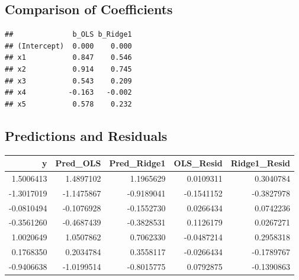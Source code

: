 \documentclass[]{book}
\newenvironment{Shaded}{\begin{snugshade}}{\end{snugshade}}
\newcommand{\KeywordTok}[1]{\textcolor[rgb]{0.13,0.29,0.53}{\textbf{#1}}}
\newcommand{\DecValTok}[1]{\textcolor[rgb]{0.00,0.00,0.81}{#1}}
\newcommand{\StringTok}[1]{\textcolor[rgb]{0.31,0.60,0.02}{#1}}
\newcommand{\OperatorTok}[1]{\textcolor[rgb]{0.81,0.36,0.00}{\textbf{#1}}}
\newcommand{\NormalTok}[1]{#1}
\begin{document}
\subsection{Comparison of
Coefficients}\label{comparison-of-coefficients}

\begin{Shaded}
\end{Shaded}

\begin{verbatim}
##              b_OLS b_Ridge1
## (Intercept)  0.000    0.000
## x1           0.847    0.546
## x2           0.914    0.745
## x3           0.543    0.209
## x4          -0.163   -0.002
## x5           0.578    0.232
\end{verbatim}

\subsection{Predictions and Residuals}\label{predictions-and-residuals}

\begin{tabular}{r|r|r|r|r}
\hline
y & Pred\_OLS & Pred\_Ridge1 & OLS\_Resid & Ridge1\_Resid\\
\hline
1.5006413 & 1.4897102 & 1.1965629 & 0.0109311 & 0.3040784\\
\hline
-1.3017019 & -1.1475867 & -0.9189041 & -0.1541152 & -0.3827978\\
\hline
-0.0810494 & -0.1076928 & -0.1552730 & 0.0266434 & 0.0742236\\
\hline
-0.3561260 & -0.4687439 & -0.3828531 & 0.1126179 & 0.0267271\\
\hline
1.0020649 & 1.0507862 & 0.7062330 & -0.0487214 & 0.2958318\\
\hline
0.1768350 & 0.2034784 & 0.3558117 & -0.0266434 & -0.1789767\\
\hline
-0.9406638 & -1.0199514 & -0.8015775 & 0.0792875 & -0.1390863\\
\hline
\end{tabular}
\end{document}
